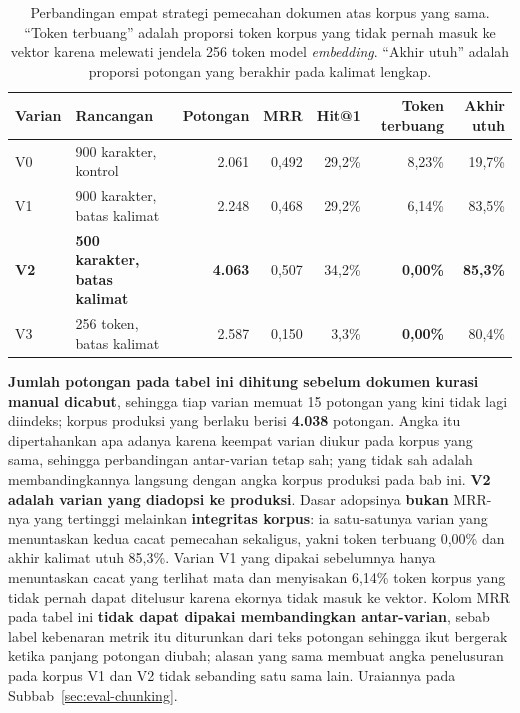 \begin{table}[htbp]
\centering
\caption{Perbandingan empat strategi pemecahan dokumen atas korpus yang sama. ``Token terbuang'' adalah proporsi token korpus yang tidak pernah masuk ke vektor karena melewati jendela 256 token model \emph{embedding}. ``Akhir utuh'' adalah proporsi potongan yang berakhir pada kalimat lengkap.}
\label{tab:strategi-chunking}
\small
\begin{tabular}{@{}llrrrrr@{}}
\toprule
\textbf{Varian} & \textbf{Rancangan} & \textbf{Potongan} & \textbf{MRR} & \textbf{Hit@1} & \textbf{Token terbuang} & \textbf{Akhir utuh} \\
\midrule
V0 & 900 karakter, kontrol & 2.061 & 0,492 & 29,2\% & 8,23\% & 19,7\% \\
V1 & 900 karakter, batas kalimat & 2.248 & 0,468 & 29,2\% & 6,14\% & 83,5\% \\
\textbf{V2} & \textbf{500 karakter, batas kalimat} & \textbf{4.063} & 0,507 & 34,2\% & \textbf{0,00\%} & \textbf{85,3\%} \\
V3 & 256 token, batas kalimat & 2.587 & 0,150 & 3,3\% & \textbf{0,00\%} & 80,4\% \\
\bottomrule
\end{tabular}

\vspace{0.4em}
{\footnotesize \textbf{Jumlah potongan pada tabel ini dihitung sebelum dokumen kurasi manual dicabut}, sehingga tiap varian memuat 15 potongan yang kini tidak lagi diindeks; korpus produksi yang berlaku berisi \textbf{4.038} potongan. Angka itu dipertahankan apa adanya karena keempat varian diukur pada korpus yang sama, sehingga perbandingan antar-varian tetap sah; yang tidak sah adalah membandingkannya langsung dengan angka korpus produksi pada bab ini. \textbf{V2 adalah varian yang diadopsi ke produksi}. Dasar adopsinya \textbf{bukan} MRR-nya yang tertinggi melainkan \textbf{integritas korpus}: ia satu-satunya varian yang menuntaskan kedua cacat pemecahan sekaligus, yakni token terbuang 0,00\% dan akhir kalimat utuh 85,3\%. Varian V1 yang dipakai sebelumnya hanya menuntaskan cacat yang terlihat mata dan menyisakan 6,14\% token korpus yang tidak pernah dapat ditelusur karena ekornya tidak masuk ke vektor. Kolom MRR pada tabel ini \textbf{tidak dapat dipakai membandingkan antar-varian}, sebab label kebenaran metrik itu diturunkan dari teks potongan sehingga ikut bergerak ketika panjang potongan diubah; alasan yang sama membuat angka penelusuran pada korpus V1 dan V2 tidak sebanding satu sama lain. Uraiannya pada Subbab~\ref{sec:eval-chunking}.}
\end{table}
